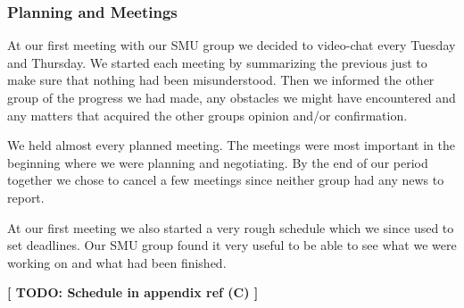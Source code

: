 \subsubsection{Planning and Meetings}
At our first meeting with our SMU group we decided to video-chat every Tuesday and Thursday. We started each meeting by summarizing the previous just to make sure that nothing had been misunderstood. Then we informed the other group of the progress we had made, any obstacles we might have encountered and any matters that acquired the other groups opinion and/or confirmation. 

We held almost every planned meeting. The meetings were most important in the beginning where we were planning and negotiating. By the end of our period together we chose to cancel a few meetings since neither group had any news to report.

At our first meeting we also started a very rough schedule which we since used to set deadlines. Our SMU group found it very useful to be able to see what we were working on and what had been finished.

\textbf{[ TODO: Schedule in appendix ref (C) ]}